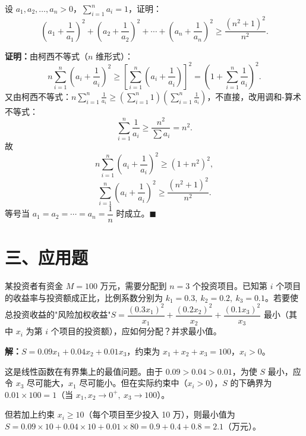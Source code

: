 \documentclass[12pt, a4paper]{ctexart}
\begin{document}
\begin{examplebox}[【例题13】综合运用柯西与排序不等式]
设 $a_1, a_2, \ldots, a_n > 0$，$\displaystyle\sum_{i=1}^n a_i = 1$，证明：
\[
  \left(a_1 + \frac{1}{a_1}\right)^2 + \left(a_2 + \frac{1}{a_2}\right)^2 + \cdots + \left(a_n + \frac{1}{a_n}\right)^2 \geqslant \frac{(n^2 + 1)^2}{n^2}.
\]
\end{examplebox}

\textbf{证明：}由柯西不等式（$n$ 维形式）：
\[
  n\sum_{i=1}^n \left(a_i + \frac{1}{a_i}\right)^2 \geqslant \left[\sum_{i=1}^n \left(a_i + \frac{1}{a_i}\right)\right]^2 = \left(1 + \sum_{i=1}^n \frac{1}{a_i}\right)^2.
\]
又由柯西不等式：$\displaystyle n\sum_{i=1}^n \frac{1}{a_i} \geqslant \left(\sum_{i=1}^n 1\right)\left(\sum_{i=1}^n \frac{1}{a_i}\right)$，不直接，改用调和-算术不等式：
\[
  \sum_{i=1}^n \frac{1}{a_i} \geqslant \frac{n^2}{\sum a_i} = n^2.
\]
故
\[
  n\sum_{i=1}^n \left(a_i + \frac{1}{a_i}\right)^2 \geqslant (1 + n^2)^2,
\]
\[
  \sum_{i=1}^n \left(a_i + \frac{1}{a_i}\right)^2 \geqslant \frac{(n^2+1)^2}{n^2}.
\]
等号当 $a_1 = a_2 = \cdots = a_n = \dfrac{1}{n}$ 时成立。\hfill $\blacksquare$

\section*{\textcolor{apppurple}{三、应用题}}

\begin{appbox}[【应用1】投资分配问题]
某投资者有资金 $M = 100$ 万元，需要分配到 $n = 3$ 个投资项目。已知第 $i$ 个项目的收益率与投资额成正比，比例系数分别为 $k_1 = 0.3,\ k_2 = 0.2,\ k_3 = 0.1$。若要使总投资收益的"风险加权收益"$S = \dfrac{(0.3x_1)^2}{x_1} + \dfrac{(0.2x_2)^2}{x_2} + \dfrac{(0.1x_3)^2}{x_3}$ 最小（其中 $x_i$ 为第 $i$ 个项目的投资额），应如何分配？并求最小值。
\end{appbox}

\textbf{解：}$S = 0.09x_1 + 0.04x_2 + 0.01x_3$，约束为 $x_1 + x_2 + x_3 = 100$，$x_i > 0$。

这是线性函数在有界集上的最值问题。由于 $0.09 > 0.04 > 0.01$，为使 $S$ 最小，应令 $x_3$ 尽可能大，$x_1$ 尽可能小。但在实际约束中（$x_i > 0$），$S$ 的下确界为 $0.01 \times 100 = 1$（当 $x_1, x_2 \to 0^+,\ x_3 \to 100$）。

但若加上约束 $x_i \geqslant 10$（每个项目至少投入 10 万），则最小值为 $S = 0.09 \times 10 + 0.04 \times 10 + 0.01 \times 80 = 0.9 + 0.4 + 0.8 = 2.1$（万元）。
\end{document}
